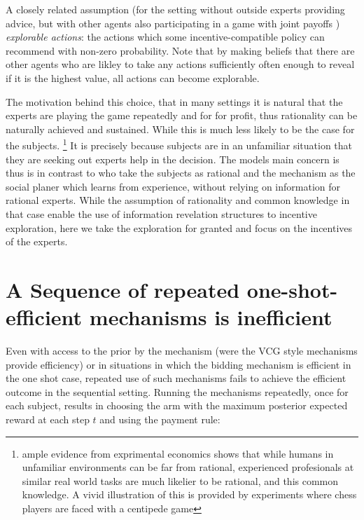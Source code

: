  A closely related assumption (for the setting without outside experts providing advice, but with other agents also participating in a game with joint payoffs \cite{mansour2016bayesian}) \emph{explorable actions}: the actions which some incentive-compatible policy can recommend with non-zero probability. Note that by making beliefs that there are other agents who are likley to take any actions sufficiently often enough to reveal if it is the highest value, all actions can become explorable.


 The motivation behind this choice, that in many settings it is natural that the experts are playing the game repeatedly and for for profit, thus rationality can be naturally achieved and sustained. 
While this is much less likely to be the case for the subjects.
\footnote{ample evidence from exprimental economics shows that while  humans in unfamiliar environments can be far from rational, experienced profesionals at similar real world tasks are much likelier to be rational, and this common knowledge. A vivid illustration of this is provided by experiments where chess players are faced with a centipede game}
It is precisely because subjects are in an unfamiliar situation that they are seeking out experts help in the decision.
The models main concern is thus is in contrast to \cite{kremer2014implementing,mansour2015bayesian}  who take the subjects as rational and the mechanism as the social planer which learns from experience, without relying on information for rational experts.
While the assumption of rationality and common knowledge in that case enable the use of information revelation structures to incentive exploration, here we take the exploration for granted and focus on the incentives of the experts.




\section{A Sequence of repeated one-shot-efficient mechanisms is inefficient}


Even with access to the prior by the mechanism (were the VCG style mechanisms provide efficiency) or in situations in which the bidding mechanism is efficient in the one shot case, repeated use of such mechanisms fails to achieve the efficient outcome in the sequential setting. 
Running the mechanisms repeatedly, once for each subject, results in choosing the arm with the maximum posterior expected reward at each step $t$ and using the payment rule:

